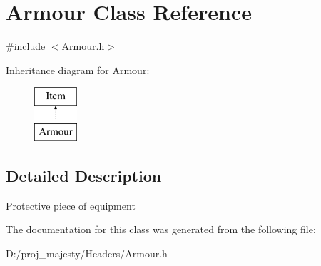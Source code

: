 \hypertarget{class_armour}{}\section{Armour Class Reference}
\label{class_armour}


{\ttfamily \#include $<$Armour.\+h$>$}

Inheritance diagram for Armour\+:\begin{figure}[H]
\begin{center}
\leavevmode
\includegraphics[height=2.000000cm]{class_armour}
\end{center}
\end{figure}


\subsection{Detailed Description}
Protective piece of equipment 

The documentation for this class was generated from the following file\+:\begin{DoxyCompactItemize}
\item 
D\+:/proj\+\_\+majesty/\+Headers/Armour.\+h\end{DoxyCompactItemize}
